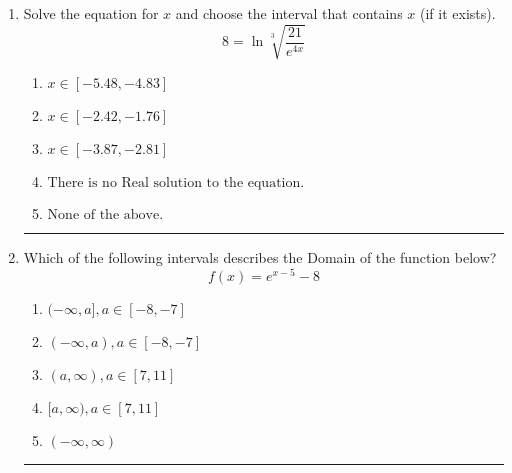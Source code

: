 \documentclass[14pt]{extbook}
\newcommand{\litem}[1]{\item#1\hspace*{-1cm}\rule{\textwidth}{0.4pt}}
\begin{document}
\begin{enumerate}
{\begin{enumerate}[label=\Alph*.]
\end{enumerate} }
\litem{
 Solve the equation for $x$ and choose the interval that contains $x$ (if it exists).\[  8 = \ln{\sqrt[3]{\frac{21}{e^{4x}}}} \]\begin{enumerate}[label=\Alph*.]
\item \( x \in [-5.48, -4.83] \)
\item \( x \in [-2.42, -1.76] \)
\item \( x \in [-3.87, -2.81] \)
\item \( \text{There is no Real solution to the equation.} \)
\item \( \text{None of the above.} \)

\end{enumerate} }
\litem{
Which of the following intervals describes the Domain of the function below?\[ f(x) = e^{x-5}-8 \]\begin{enumerate}[label=\Alph*.]
\item \( (-\infty, a], a \in [-8, -7] \)
\item \( (-\infty, a), a \in [-8, -7] \)
\item \( (a, \infty), a \in [7, 11] \)
\item \( [a, \infty), a \in [7, 11] \)
\item \( (-\infty, \infty) \)

\end{enumerate} }
\end{enumerate}
\end{document}
